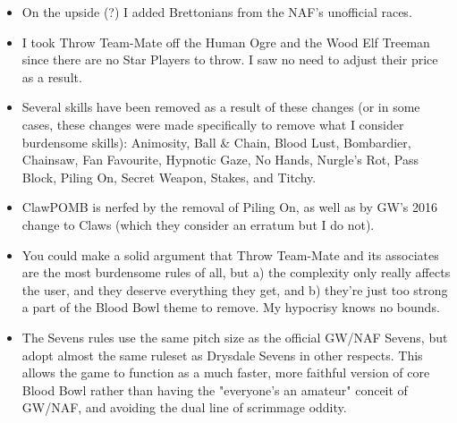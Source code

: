 \begin{multicols}{2}
\begin{itemize}
\item On the upside (?) I added Brettonians from the NAF's unofficial races.
\item I took Throw Team-Mate off the Human Ogre and the Wood Elf Treeman since there are no Star Players to throw. I saw no need to adjust their price as a result.
\item Several skills have been removed as a result of these changes (or in some cases, these changes were made specifically to remove what I consider burdensome skills): Animosity, Ball \& Chain, Blood Lust, Bombardier, Chainsaw, Fan Favourite, Hypnotic Gaze, No Hands, Nurgle's Rot, Pass Block, Piling On, Secret Weapon, Stakes, and Titchy.
\item ClawPOMB is nerfed by the removal of Piling On, as well as by GW's 2016 change to Claws (which they consider an erratum but I do not).
\item You could make a solid argument that Throw Team-Mate and its associates are the most burdensome rules of all, but a) the complexity only really affects the user, and they deserve everything they get, and b) they're just too strong a part of the Blood Bowl theme to remove. My hypocrisy knows no bounds.
\item The Sevens rules use the same pitch size as the official GW/NAF Sevens, but adopt almost the same ruleset as Drysdale Sevens in other respects. This allows the game to function as a much faster, more faithful version of core Blood Bowl rather than having the "everyone's an amateur" conceit of GW/NAF, and avoiding the dual line of scrimmage oddity.
\end{itemize}

\end{multicols}

